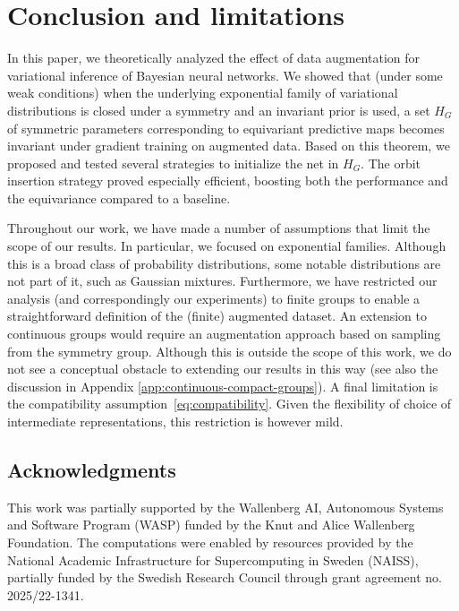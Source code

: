 \documentclass{article}
\begin{document}
\section{Conclusion and limitations} In this paper, we theoretically analyzed the effect of data augmentation for variational inference of Bayesian neural networks. We showed that (under some weak conditions) when the underlying exponential family of variational distributions is closed under a symmetry and an invariant prior is used, a set $H_G$ of symmetric parameters corresponding to equivariant predictive maps becomes invariant under gradient training on augmented data. Based on this theorem, we proposed and tested several strategies to initialize the net in $H_G$. The orbit insertion strategy proved especially efficient, boosting both the performance and the equivariance compared to a baseline. 

Throughout our work, we have made a number of assumptions that limit the scope of our results. In particular, we focused on exponential families. Although this is a broad class of probability distributions, some notable distributions are not part of it, such as Gaussian mixtures. Furthermore, we have restricted our analysis (and correspondingly our experiments) to finite groups to enable a straightforward definition of the (finite) augmented dataset. An extension to continuous groups would require an augmentation approach based on sampling from the symmetry group. Although this is outside the scope of this work, we do not see a conceptual obstacle to extending our results in this way (see also the discussion in Appendix \ref{app:continuous-compact-groups}). A final limitation is the compatibility assumption~\eqref{eq:compatibility}. Given the flexibility of choice of intermediate representations, this restriction is however mild. 

\subsection*{Acknowledgments} This work was partially supported by the Wallenberg AI, Autonomous Systems and Software Program (WASP) funded by the Knut and Alice Wallenberg Foundation. The computations were enabled by resources provided by the National Academic Infrastructure for Supercomputing in Sweden (NAISS), partially funded by the Swedish Research Council through grant agreement no. 2025/22-1341.




\end{document}
